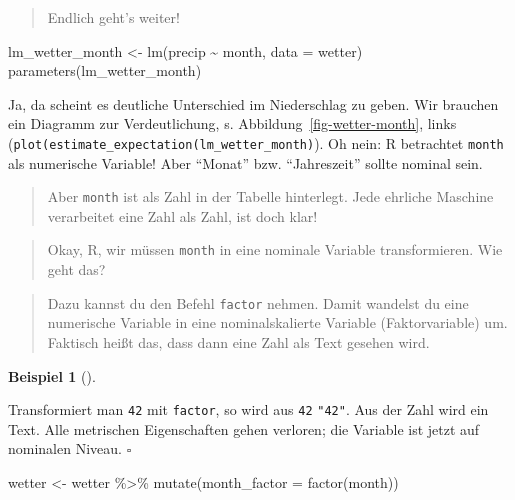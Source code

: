 \documentclass[
  letterpaper,
  oneside,
  open=any]{scrbook}
\newenvironment{Shaded}{\begin{snugshade}}{\end{snugshade}}
\newcommand{\AttributeTok}[1]{\textcolor[rgb]{0.40,0.45,0.13}{#1}}
\newcommand{\FunctionTok}[1]{\textcolor[rgb]{0.28,0.35,0.67}{#1}}
\newcommand{\NormalTok}[1]{\textcolor[rgb]{0.00,0.23,0.31}{#1}}
\newcommand{\OtherTok}[1]{\textcolor[rgb]{0.00,0.23,0.31}{#1}}
\newcommand{\SpecialCharTok}[1]{\textcolor[rgb]{0.37,0.37,0.37}{#1}}
\theoremstyle{definition}
\theoremstyle{definition}
\newtheorem{example}{Beispiel}[chapter]
\theoremstyle{definition}
\theoremstyle{remark}
\begin{document}
\begin{quote}
{} Endlich geht's weiter!
\end{quote}

\begin{Shaded}
\begin{Highlighting}[]
\NormalTok{lm\_wetter\_month }\OtherTok{\textless{}{-}} \FunctionTok{lm}\NormalTok{(precip }\SpecialCharTok{\textasciitilde{}}\NormalTok{ month, }\AttributeTok{data =}\NormalTok{ wetter)}
\FunctionTok{parameters}\NormalTok{(lm\_wetter\_month)}
\end{Highlighting}
\end{Shaded}

Ja, da scheint es deutliche Unterschied im Niederschlag zu geben. Wir
brauchen ein Diagramm zur Verdeutlichung, s.
Abbildung~\ref{fig-wetter-month}, links
(\texttt{plot(estimate\_expectation(lm\_wetter\_month)}). Oh nein: R
betrachtet \texttt{month} als numerische Variable! Aber \enquote{Monat}
bzw. \enquote{Jahreszeit} sollte nominal sein.

\begin{quote}
{} Aber \texttt{month} ist als Zahl in der Tabelle
hinterlegt. Jede ehrliche Maschine verarbeitet eine Zahl als Zahl, ist
doch klar!
\end{quote}

\begin{quote}
{} Okay, R, wir müssen \texttt{month} in eine nominale
Variable transformieren. Wie geht das?
\end{quote}

\begin{quote}
{} Dazu kannst du den Befehl \texttt{factor} nehmen. Damit
wandelst du eine numerische Variable in eine nominalskalierte Variable
(Faktorvariable) um. Faktisch heißt das, dass dann eine Zahl als Text
gesehen wird.
\end{quote}

\begin{example}[]\protect\hypertarget{exm-factor}{}\label{exm-factor}

Transformiert man \texttt{42} mit \texttt{factor}, so wird aus
\texttt{42} \texttt{"42"}. Aus der Zahl wird ein Text. Alle metrischen
Eigenschaften gehen verloren; die Variable ist jetzt auf nominalen
Niveau. \(\square\)

\end{example}

\begin{Shaded}
\begin{Highlighting}[]
\NormalTok{wetter }\OtherTok{\textless{}{-}}
\NormalTok{  wetter }\SpecialCharTok{\%\textgreater{}\%} 
  \FunctionTok{mutate}\NormalTok{(}\AttributeTok{month\_factor =} \FunctionTok{factor}\NormalTok{(month))}
\end{Highlighting}
\end{Shaded}
\end{document}

